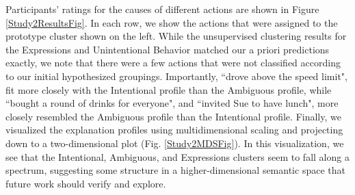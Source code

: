 \documentclass[10pt,letterpaper]{article}
\newcommand{\red}[1]{\textcolor{Red}{#1}}
\newcommand{\ndg}[1]{\textcolor{Green}{[ndg: #1]}}
\begin{document}
Participants' ratings for the causes of different actions are shown in Figure \ref{Study2ResultsFig}. In each row, we show the actions that were assigned to the prototype cluster shown on the left. While the unsupervised clustering results for the Expressions and Unintentional Behavior matched our a priori predictions exactly, we note that there were a few actions that were not classified according to our initial hypothesized groupings. Importantly, ``drove above the speed limit", fit more closely with the Intentional profile than the Ambiguous profile, while ``bought a round of drinks for everyone", and ``invited Sue to have lunch", more closely resembled the Ambiguous profile than the Intentional profile.
Finally, we visualized the explanation profiles using multidimensional scaling and projecting down to a two-dimensional plot (Fig. \ref{Study2MDSFig}). In this visualization, we see that the Intentional, Ambiguous, and Expressions clusters seem to fall along a spectrum, suggesting some structure in a higher-dimensional semantic space that future work should verify and explore.





\end{document}
